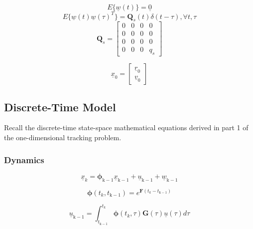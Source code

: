 \documentclass{article}
\begin{document}
\begin{equation*}
    E\{\underline{w}(t)\} = \underline{0}
\end{equation*}
\begin{equation*}
    E\{\underline{w}(t)\underline{w}(\tau)^T\} = \mathbf{Q}_s(t)\delta(t-\tau), \forall t,\tau
\end{equation*}
\begin{equation*}
    \mathbf{Q}_s = 
    \begin{bmatrix} 0 & 0 & 0 & 0 \\ 0 & 0 & 0 & 0 \\ 0 & 0 & 0 & 0 \\ 0 & 0 & 0 & q_s \end{bmatrix}
\end{equation*}

\begin{equation*}
    \underline{x}_0 = \begin{bmatrix}
            \underline{r}_0 \\ \underline{v}_0
        \end{bmatrix}
\end{equation*}

\subsection{Discrete-Time Model}
Recall the discrete-time state-space mathematical equations derived in part 1 of the one-dimensional tracking problem.

\subsubsection{Dynamics}

\begin{equation}
    \underline{x}_k = \boldsymbol{\phi}_\mathrm{k-1}\underline{x}_\mathrm{k-1} + \underline{u}_\mathrm{k-1} + \underline{w}_\mathrm{k-1}
\end{equation}

\begin{equation}
    \boldsymbol{\phi}(t_k,t_\mathrm{k-1}) = e^{\mathbf{F}(t_k - t_\mathrm{k-1})}
\end{equation}

\begin{equation}
    \underline{u}_\mathrm{k-1} = \int_{t_\mathrm{k-1}}^{t_k} \boldsymbol{\phi}(t_k, \tau)\mathbf{G}(\tau)\underline{u}(\tau)d\tau
\end{equation}
\end{document}
